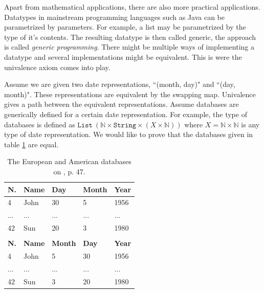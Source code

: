 \documentclass[11pt,a4paper,twoside,xetex,draft]{book}
\newcommand{\keyword}[1]{\emph{#1}\index{#1}}
\newcommand{\op}[1]{\mathtt{#1}}
\begin{document}
Apart from mathematical applications, there are also more practical applications. Datatypes in mainstream programming languages such as Java can be parametrized by parameters. For example, a list may be parametrized by the type of it's contents. The resulting datatype is then called generic, the approach is called \keyword{generic programming}. There might be multiple ways of implementing a datatype and several implementations might be equivalent. This is were the univalence axiom comes into play. 

Assume we are given two date representations, ``(month, day)" and ``(day, month)". These representations are equivalent by the swapping map. Univalence gives a path between the equivalent representations. Assume databases are generically defined for a certain date representation. For example, the type of databases is defined as $\op{List} \ (\mathbb{N} \times \op{String} \times (X \times \mathbb{N}))$ where $X = \mathbb{N} \times \mathbb{N}$ is any type of date representation. We would like to prove that the databases given in table \ref{databases} are equal.

\begin{table}[]
\centering
\begin{tabular}{lllll}
\hline
\textbf{N.} & \textbf{Name} & \textbf{Day} & \textbf{Month} & \textbf{Year} \\ \hline
4           & John          & 30           & 5              & 1956          \\
...  		& ...			& ...			& ...			& ...			\\
42          & Sun           & 20           & 3              & 1980          \\ \hline

\hline \\
\hline
\textbf{N.} & \textbf{Name} & \textbf{Month} & \textbf{Day} & \textbf{Year} \\ \hline
4           & John          & 5              & 30           & 1956          \\
...  		& ...			& ...			& ...			& ...			\\
42          & Sun           & 3              & 20           & 1980          \\ \hline
\end{tabular}
\caption{The European and American databases on \cite{Licata2013}, p. 47. \label{databases}}

\end{table}
\end{document}
